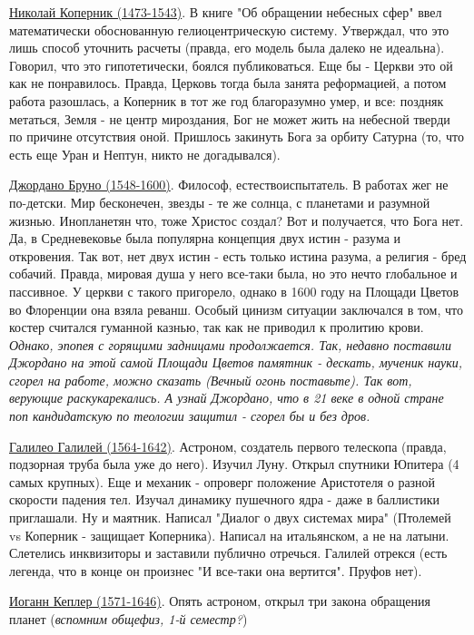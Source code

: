 \underline{Николай Коперник (1473-1543)}. В книге "Об обращении небесных сфер" ввел математически обоснованную гелиоцентрическую систему. Утверждал, что это лишь способ уточнить расчеты (правда, его модель была далеко не идеальна). Говорил, что это гипотетически, боялся публиковаться. Еще бы - Церкви это ой как не понравилось. Правда, Церковь тогда была занята реформацией, а потом работа разошлась, а Коперник в тот же год благоразумно умер, и все: поздняк метаться, Земля - не центр мироздания, Бог не может жить на небесной тверди по причине отсутствия оной. Пришлось закинуть Бога за орбиту Сатурна (то, что есть еще Уран и Нептун, никто не догадывался).

\underline{Джордано Бруно (1548-1600)}. Философ, естествоиспытатель. В работах жег не по-детски. Мир бесконечен, звезды - те же солнца, с планетами и разумной жизнью. Инопланетян что, тоже Христос создал? Вот и получается, что Бога нет. Да, в Средневековье была популярна концепция двух истин - разума и откровения. Так вот, нет двух истин - есть только истина разума, а религия - бред собачий.  Правда, мировая душа у него все-таки была, но это нечто глобальное и пассивное. У церкви с такого пригорело, однако в 1600 году на Площади Цветов во Флоренции она взяла реванш. Особый цинизм ситуации заключался в том, что костер считался гуманной казнью, так как не приводил к пролитию крови. \textit{Однако, эпопея с горящими задницами продолжается. Так, недавно поставили Джордано на этой самой Площади Цветов памятник - дескать, мученик науки, сгорел на работе, можно сказать (\textit{Вечный огонь поставьте}). Так вот, верующие раскукарекались. А узнай Джордано, что в 21 веке в одной стране поп кандидатскую по теологии защитил - сгорел бы и без дров.}

\underline{Галилео Галилей (1564-1642)}. Астроном, создатель первого телескопа (правда, подзорная труба была уже до него). Изучил Луну. Открыл спутники Юпитера (4 самых крупных). Еще и механик - опроверг положение Аристотеля о разной скорости падения тел. Изучал динамику пушечного ядра - даже в баллистики приглашали. Ну и маятник. Написал "Диалог о двух системах мира" (Птолемей vs Коперник - защищает Коперника). Написал на итальянском, а не на латыни. Слетелись инквизиторы и заставили публично отречься. Галилей отрекся (есть легенда, что в конце он произнес "И все-таки она вертится". Пруфов нет).  

\underline{Иоганн Кеплер (1571-1646)}. Опять астроном, открыл три закона обращения планет (\textit{вспомним общефиз, 1-й семестр?})

